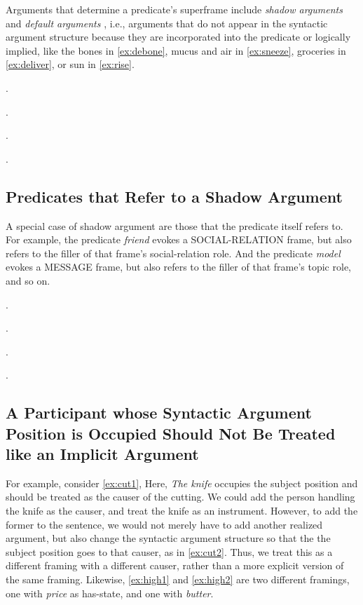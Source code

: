 \documentclass[a4paper]{article}
\newcommand{\fr}[1]{\textsf{#1}}
\newcommand{\rl}[1]{\textsf{#1}}
\begin{document}
Arguments that determine a predicate's superframe include \emph{shadow
arguments} and \emph{default arguments}
\citep{pustejovsky-1995-generative,di-fabio-etal-2019-verbatlas}, i.e.,
arguments that do not appear in the syntactic argument structure because they
are incorporated into the predicate or logically implied, like the bones in
\ref{ex:debone}, mucus and air in \ref{ex:sneeze}, groceries in
\ref{ex:deliver}, or sun in \ref{ex:rise}.

\ex.\label{ex:debone}

\ex.\label{ex:sneeze}

\ex.\label{ex:deliver}

\ex.\label{ex:rise}


\newpage\subsection{Predicates that Refer to a Shadow Argument}

A special case of shadow argument are those that the predicate itself refers
to. For example, the predicate \emph{friend} evokes a \fr{SOCIAL-RELATION}
frame, but also refers to the filler of that frame's \rl{social-relation} role.
And the predicate \emph{model} evokes a \fr{MESSAGE} frame, but also refers to
the filler of that frame's \rl{topic} role, and so on.

\ex.

\ex.

\ex.

\ex.


\newpage\subsection{A Participant whose Syntactic Argument Position is Occupied Should Not Be Treated like an Implicit Argument}

For example, consider \ref{ex:cut1}, Here, \emph{The knife} occupies the subject position and should be treated as the causer of the cutting. We could add the person handling the knife as the causer, and treat the knife as an instrument. However, to add the former to the sentence, we would not merely have to add another realized argument, but also change the syntactic argument structure so that the the subject position goes to that causer, as in \ref{ex:cut2}. Thus, we treat this as a different framing with a different causer, rather than a more explicit version of the same framing. Likewise, \ref{ex:high1} and \ref{ex:high2} are two different framings, one with \emph{price} as \rl{has-state}, and one with \emph{butter}.
\end{document}
